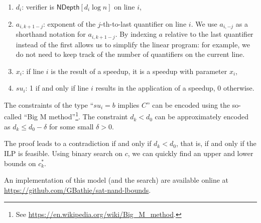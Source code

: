 \documentclass[a4paper, 11pt]{article}
\theoremstyle{plain}
\theoremstyle{definition}
\theoremstyle{remark}
\newcommand{\ND}{\textsf{NDepth}}%
\newcommand{\NDL}[1]{\ND\left[ #1 \log n\right]}%
\begin{document}
\begin{enumerate}
	\item $d_i$: verifier is $\NDL{d_i}$ on line $i$,
	\item $a_{i,k+1-j}$: exponent of the $j$-th-to-last quantifier on line $i$. 
	We use $a_{i,-j}$ as a shorthand notation for $a_{i,k+1-j}$. 
	By indexing $a$ relative to the last quantifier instead of the first allows us to simplify
	the linear program: for example, 
	we do not need to keep track of the number of quantifiers on the current line. 
	\item $x_i$: if line $i$ is the result of a speedup, it is a speedup with parameter $x_i$,
	\item $su_{i}$: 1 if and only if line $i$ results in the application of a speedup, 0 otherwise.
\end{enumerate}
The constraints of the type ``$su_i = b$ implies $C$'' can be encoded using the so-called ``Big M method''\footnote{See \url{https://en.wikipedia.org/wiki/Big\_M\_method}.}. 
The constraint $d_k < d_0$ can be approximately encoded as $d_k \le d_0 - \delta$ for some small $\delta > 0$.

The proof leads to a contradiction if and only if $d_k < d_0$, 
that is, if and only if the ILP is feasible.
Using binary search on $c$, we can quickly find an upper and lower bounds on $c_k^*$.

An implementation of this model (and the search) are available online at \url{https://github.com/GBathie/sat-nand-lbounds}.



\end{document}
